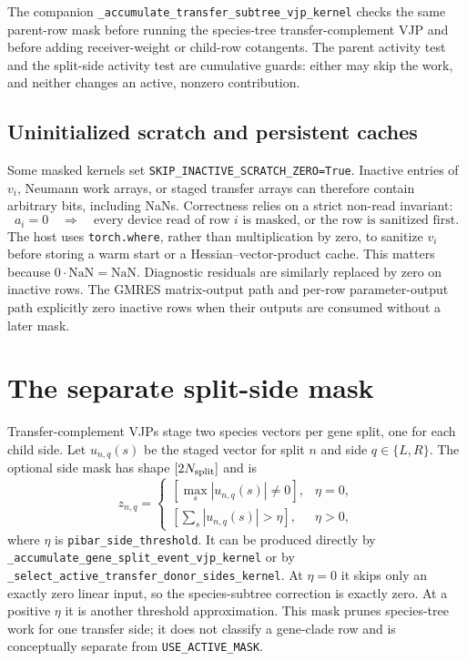 \documentclass[11pt]{article}
\newcommand{\abs}[1]{\left\lvert #1\right\rvert}
\newcommand{\kernel}[1]{\nolinkurl{#1}}
\newcommand{\code}[1]{\nolinkurl{#1}}
\begin{document}
The companion
\kernel{_accumulate_transfer_subtree_vjp_kernel} checks the same
parent-row mask before running the species-tree transfer-complement VJP and
before adding receiver-weight or child-row cotangents.  The parent activity
test and the split-side activity test are cumulative guards: either may skip
the work, and neither changes an active, nonzero contribution.

\subsection{Uninitialized scratch and persistent caches}

Some masked kernels set \code{SKIP\_INACTIVE\_SCRATCH\_ZERO=True}.  Inactive
entries of $v_i$, Neumann work arrays, or staged transfer arrays can therefore
contain arbitrary bits, including NaNs.  Correctness relies on a strict
non-read invariant:
\begin{equation}
  a_i=0 \quad\Longrightarrow\quad
  \text{every device read of row }i\text{ is masked, or the row is sanitized first}.
  \label{eq:no-read}
\end{equation}
The host uses \code{torch.where}, rather than multiplication by zero, to
sanitize $v_i$ before storing a warm start or a Hessian--vector-product cache.
This matters because $0\cdot\mathrm{NaN}=\mathrm{NaN}$.  Diagnostic residuals
are similarly replaced by zero on inactive rows.  The GMRES matrix-output path
and per-row parameter-output path explicitly zero inactive rows when their
outputs are consumed without a later mask.

\section{The separate split-side mask}
\label{sec:side-mask}

Transfer-complement VJPs stage two species vectors per gene split, one for
each child side.  Let $u_{n,q}(s)$ be the staged vector for split $n$ and side
$q\in\{L,R\}$.  The optional side mask has shape $[2N_{\rm split}]$ and is
\begin{equation}
  z_{n,q}=
  \begin{cases}
    [\max_s\abs{u_{n,q}(s)}\ne0], & \eta=0,\\
    [\sum_s\abs{u_{n,q}(s)}>\eta], & \eta>0,
  \end{cases}
  \label{eq:side-mask}
\end{equation}
where $\eta$ is \code{pibar\_side\_threshold}.  It can be produced directly
by \kernel{_accumulate_gene_split_event_vjp_kernel} or by
\kernel{_select_active_transfer_donor_sides_kernel}.  At $\eta=0$ it skips only an exactly
zero linear input, so the species-subtree correction is exactly zero.  At a
positive $\eta$ it is another threshold approximation.  This mask prunes
species-tree work for one transfer side; it does not classify a gene-clade
row and is conceptually separate from \code{USE\_ACTIVE\_MASK}.
\end{document}
